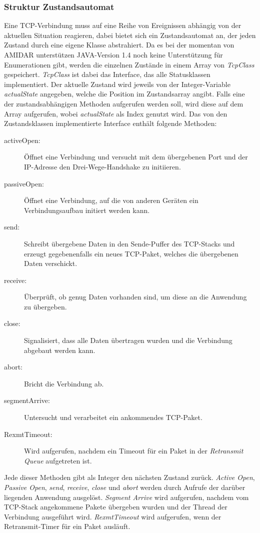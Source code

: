 \subsubsection{Struktur Zustandsautomat}
Eine TCP-Verbindung muss auf eine Reihe von Ereignissen abhängig von der aktuellen Situation reagieren, dabei bietet sich ein Zustandsautomat an, der jeden Zustand durch eine eigene Klasse abstrahiert. Da es bei der momentan von AMIDAR unterstützen JAVA-Version 1.4 noch keine Unterstützung für Enumerationen gibt, werden die einzelnen Zustände in einem Array von \textit{TcpClass} gespeichert. \textit{TcpClass} ist dabei das Interface, das alle Statusklassen implementiert. Der aktuelle Zustand wird jeweils von der Integer-Variable \textit{actualState} angegeben, welche die Position im Zustandsarray angibt. Falls eine der zustandsabhängigen Methoden aufgerufen werden soll, wird diese auf dem Array aufgerufen, wobei \textit{actualState} als Index genutzt wird. Das von den Zustandsklassen implementierte Interface enthält folgende Methoden:
\begin{description}
\item[activeOpen:] Öffnet eine Verbindung und versucht mit dem übergebenen Port und der IP-Adresse den Drei-Wege-Handshake zu initiieren. 
\item[passiveOpen:] Öffnet eine Verbindung, auf die von anderen Geräten ein Verbindungsaufbau initiert werden kann. 
\item[send:] Schreibt übergebene Daten in den Sende-Puffer des TCP-Stacks und erzeugt gegebenenfalls ein neues TCP-Paket, welches die übergebenen Daten verschickt. 
\item[receive:] Überprüft, ob genug Daten vorhanden sind, um diese an die Anwendung zu übergeben. 
\item[close:] Signalisiert, dass alle Daten übertragen wurden und die Verbindung abgebaut werden kann. 
\item[abort:] Bricht die Verbindung ab.
\item[segmentArrive:] Untersucht und verarbeitet ein ankommendes TCP-Paket.
\item[RexmtTimeout:] Wird aufgerufen, nachdem ein Timeout für ein Paket in der \textit{Retransmit Queue} aufgetreten ist. 
\end{description}
Jede dieser Methoden gibt als Integer den nächsten Zustand zurück. \textit{Active Open}, \textit{Passive Open}, \textit{send}, \textit{receive}, \textit{close} und \textit{abort} werden durch Aufrufe der darüber liegenden Anwendung ausgelöst. \textit{Segment Arrive} wird aufgerufen, nachdem vom TCP-Stack angekommene Pakete übergeben wurden und der Thread der Verbindung ausgeführt wird. 
\textit{RexmtTimeout} wird aufgerufen, wenn der Retransmit-Timer für ein Paket ausläuft. 

